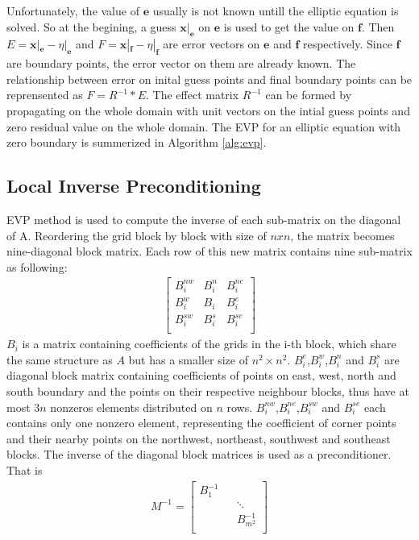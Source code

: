 \documentclass{sig-alternate}
\begin{document}
Unfortunately, the value of $\textbf{e}$ usually  is not known untill the elliptic equation is solved. 
So at the begining, a guess $\textbf{x}|_\textbf{e}$ on $\textbf{e}$ is used to get the value on $\textbf{f}$. 
Then $E=\textbf{x}|_\textbf{e} -\eta|_\textbf{e}$ and $F=\textbf{x}|_\textbf{f} -\eta|_\textbf{f}$ are error vectors on $\textbf{e}$ and $\textbf{f}$ respectively. 
Since  $\textbf{f}$ are boundary points, the error vector on them are already known. 
The relationship between error on inital guess points and final boundary points can be reprensented as $F=R^{-1}*E$. 
The effect matrix $R^{-1}$ can be formed by propagating on the whole domain with unit vectors on the intial guess points and zero residual value on the whole domain. 
The EVP for an elliptic equation with zero boundary is summerized in Algorithm \ref{alg:evp}. 


\subsection{Local Inverse Preconditioning}

EVP method is used to compute the inverse of each sub-matrix on the diagonal of A. 
Reordering the grid block by block with size of $nxn$, the matrix becomes nine-diagonal block matrix. 
Each row of this new matrix contains nine sub-matrix as following:
\begin{eqnarray*}
    \left [
        \begin{array}{ccc}
        B_i^{nw} &  B_i^n & B_i^{ne} \\
        B_i^{w} &   B_i   & B_i^{e} \\
        B_i^{sw} &  B_i^s & B_i^{se} \\
    \end{array}
    \right ]
\end{eqnarray*}
$B_i$ is a matrix containing coefficients of the grids in the i-th block, which share the same structure as $A$ but has a smaller size of $n^2\times n^2$. 
$B_i^e$,$B_i^w$,$B_i^n$ and $B_i^s$ are diagonal block matrix containing coefficients of points on east, west, north and south boundary and the points on their respective neighbour blocks, thus have at most $3n$ nonzeros elements distributed on $n$ rows. 
$B_i^{nw}$,$B_i^{ne}$,$B_i^{sw}$ and $B_i^{se}$ each contains only one nonzero element, representing the coefficient of corner points and their nearby points on the northwest, northeast, southwest and southeast blocks. 
The inverse of the diagonal block matrices is used as a preconditioner. That is 
\begin{eqnarray*}
M^{-1}=    \left [
        \begin{array}{ccccccc}
        B_1^{-1} &   &  \\
         & &\ddots  \\
        &   &  B_{m^2}^{-1} \\
    \end{array}
    \right ]
\end{eqnarray*}
\end{document}
